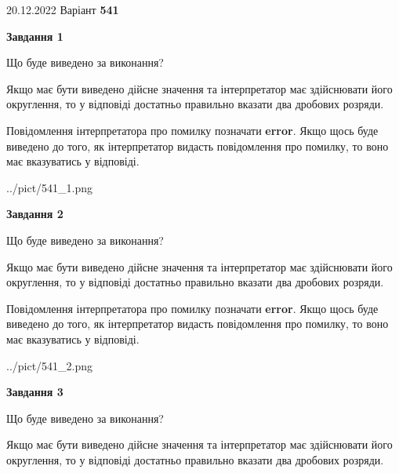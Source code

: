 \documentclass[12pt, ukrainian]{article}
\begin{document}
{20.12.2022 Варіант \No \textbf { 541 }\par}
{
\begin {Large}

{\begin {center}\textbf{Завдання 1}\end {center}}\par
Що буде виведено за виконання? \par

Якщо має бути виведено дійсне значення та інтерпретатор має здійснювати його округлення, 
то у відповіді достатньо правильно вказати два дробових розряди.

Повідомлення інтерпретатора про помилку позначати \textbf{error}.
Якщо щось буде виведено до того, як інтерпретатор видасть повідомлення про помилку, 
то воно має вказуватись у відповіді. \par

\begin{center}
	{../pict/541_1.png}
\end{center}
\newpage

{\begin {center}\textbf{Завдання 2}\end {center}}\par
Що буде виведено за виконання? \par

Якщо має бути виведено дійсне значення та інтерпретатор має здійснювати його округлення, 
то у відповіді достатньо правильно вказати два дробових розряди.

Повідомлення інтерпретатора про помилку позначати \textbf{error}.
Якщо щось буде виведено до того, як інтерпретатор видасть повідомлення про помилку, 
то воно має вказуватись у відповіді. \par

\begin{center}
	{../pict/541_2.png}
\end{center}
\newpage

{\begin {center}\textbf{Завдання 3}\end {center}}\par
Що буде виведено за виконання? \par

Якщо має бути виведено дійсне значення та інтерпретатор має здійснювати його округлення, 
то у відповіді достатньо правильно вказати два дробових розряди.


\end{Large}}
\end{document}
